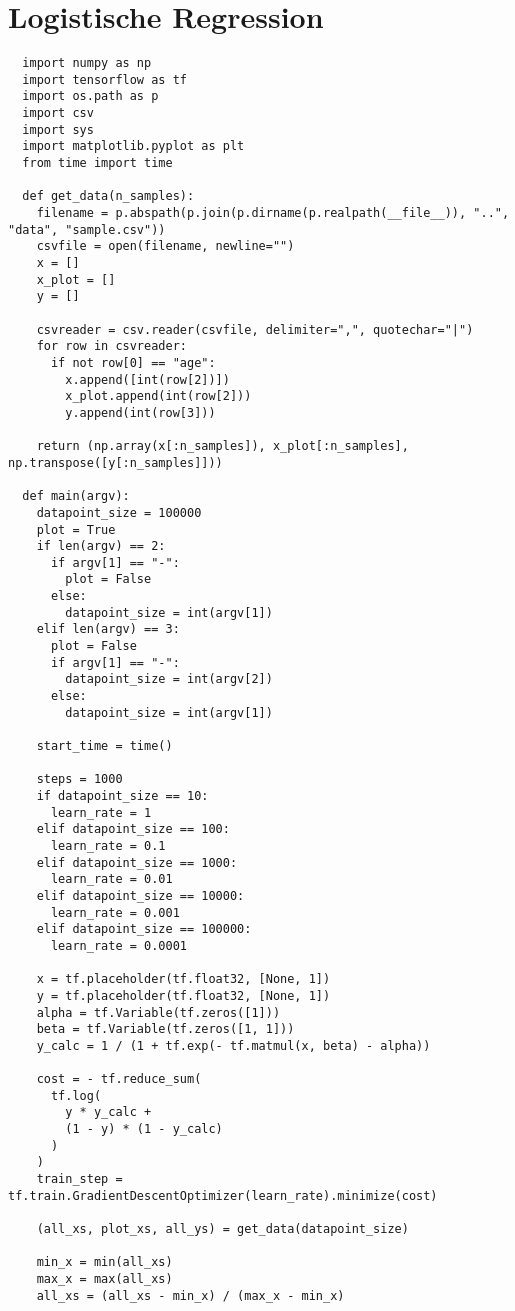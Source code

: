 \section{Logistische Regression}
\label{appendix:C:3}

\begin{verbatim}
  import numpy as np
  import tensorflow as tf
  import os.path as p
  import csv
  import sys
  import matplotlib.pyplot as plt
  from time import time

  def get_data(n_samples):
    filename = p.abspath(p.join(p.dirname(p.realpath(__file__)), "..", "data", "sample.csv"))
    csvfile = open(filename, newline="")
    x = []
    x_plot = []
    y = []

    csvreader = csv.reader(csvfile, delimiter=",", quotechar="|")
    for row in csvreader:
      if not row[0] == "age":
        x.append([int(row[2])])
        x_plot.append(int(row[2]))
        y.append(int(row[3]))

    return (np.array(x[:n_samples]), x_plot[:n_samples], np.transpose([y[:n_samples]]))

  def main(argv):
    datapoint_size = 100000
    plot = True
    if len(argv) == 2:
      if argv[1] == "-":
        plot = False
      else:
        datapoint_size = int(argv[1])
    elif len(argv) == 3:
      plot = False
      if argv[1] == "-":
        datapoint_size = int(argv[2])
      else:
        datapoint_size = int(argv[1])

    start_time = time()

    steps = 1000
    if datapoint_size == 10:
      learn_rate = 1
    elif datapoint_size == 100:
      learn_rate = 0.1
    elif datapoint_size == 1000:
      learn_rate = 0.01
    elif datapoint_size == 10000:
      learn_rate = 0.001
    elif datapoint_size == 100000:
      learn_rate = 0.0001

    x = tf.placeholder(tf.float32, [None, 1])
    y = tf.placeholder(tf.float32, [None, 1])
    alpha = tf.Variable(tf.zeros([1]))
    beta = tf.Variable(tf.zeros([1, 1]))
    y_calc = 1 / (1 + tf.exp(- tf.matmul(x, beta) - alpha))

    cost = - tf.reduce_sum(
      tf.log(
        y * y_calc +
        (1 - y) * (1 - y_calc)
      )
    )
    train_step = tf.train.GradientDescentOptimizer(learn_rate).minimize(cost)

    (all_xs, plot_xs, all_ys) = get_data(datapoint_size)

    min_x = min(all_xs)
    max_x = max(all_xs)
    all_xs = (all_xs - min_x) / (max_x - min_x)


\end{verbatim}
